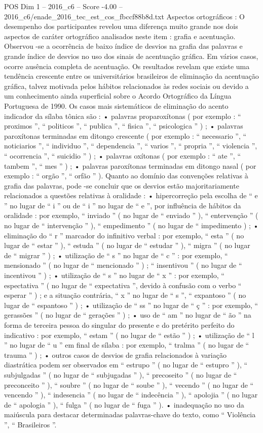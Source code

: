 \begin{textsample}{POS Dim 1 – 2016\_c6 – Score -4.00 – 2016\_c6/enade\_2016\_tec\_est\_cos\_fbccf88b8d.txt}
Aspectos ortográficos : O desempenho dos participantes revelou uma diferença muito grande nos dois aspectos de caráter ortográfico analisados neste item : grafia e acentuação.
Observou -se a ocorrência de baixo índice de desvios na grafia das palavras e grande índice de desvios no uso dos sinais de acentuação gráfica.
Em vários casos, ocorre ausência completa de acentuação.
Os resultados revelam que existe uma tendência crescente entre os universitários brasileiros de eliminação da acentuação gráfica, talvez motivada pelos hábitos relacionados às redes sociais ou devido a um conhecimento ainda superficial sobre o Acordo Ortográfico da Língua Portuguesa de 1990.
Os casos mais sistemáticos de eliminação do acento indicador da sílaba tônica são : • palavras proparoxítonas ( por exemplo : “ proximos ”, “ politicos ”, “ publica ”, “ fisica ”, “ psicologica ” ) ; • palavras paroxítonas terminadas em ditongo crescente ( por exemplo : “ necessario ”, “ noticiarios ”, “ individuo ”, “ dependencia ”, “ varios ”, “ propria ”, “ violencia ”, “ ocorrencia ”, “ suicidio ” ) ; • palavras oxítonas ( por exemplo : “ ate ”, “ tambem ”, “ mes ” ) ; • palavras paroxítonas terminadas em ditongo nasal ( por exemplo : “ orgão ”, “ orfão ” ).
Quanto ao domínio das convenções relativas à grafia das palavras, pode -se concluir que os desvios estão majoritariamente relacionados a questões relativas à oralidade : • hipercorreção pela escolha de “ e ” no lugar de “ i ” ou de “ i ” no lugar de “ e ”, por influência de hábitos da oralidade : por exemplo, “ inviado ” ( no lugar de “ enviado ” ), “ entervenção ” ( no lugar de “ intervenção ” ), “ empedimento ” ( no lugar de “ impedimento ) ; • eliminação do “ r ” marcador do infinitivo verbal : por exemplo, “ esta ” ( no lugar de “ estar ” ), “ estuda ” ( no lugar de “ estudar ” ), “ migra ” ( no lugar de “ migrar ” ) ; • utilização de “ s ” no lugar de “ c ” : por exemplo, “ mensionado ” ( no lugar de “ mencionado ” ) ; “ insentivou ” ( no lugar de “ incentivou ” ) ; • utilização de “ s ” no lugar de “ x ” : por exemplo, “ espectativa ” ( no lugar de “ expectativa ”, devido à confusão com o verbo “ esperar ” ) ; e a situação contrária, “ x ” no lugar de “ s ”, “ expantoso ” ( no lugar de “ espantoso ” ) ; • utilização de “ ss ” no lugar de “ ç ” : por exemplo, “ gerassões ” ( no lugar de “ gerações ” ) ; • uso de “ am ” no lugar de “ ão ” na forma de terceira pessoa do singular do presente e do pretérito perfeito do indicativo : por exemplo, “ estam ” ( no lugar de “ estão ” ) ; • utilização de “ l ” no lugar de “ u ” em final de sílaba : por exemplo, “ tralma ” ( no lugar de “ trauma ” ) ; • outros casos de desvios de grafia relacionados à variação diastrática podem ser observados em “ estrupo ” ( no lugar de “ estupro ” ), “ subjulgadas ” ( no lugar de “ subjugadas ” ), “ precoseito ” ( no lugar de “ preconceito ” ), “ soubre ” ( no lugar de “ soube ” ), “ vecendo ” ( no lugar de “ vencendo ” ), “ indesencia ” ( no lugar de “ indecência ” ), “ apolojia ” ( no lugar de “ apologia ” ), “ fulga ” ( no lugar de “ fuga ” ). • inadequação no uso da maiúscula para destacar determinadas palavras-chave do texto, como “ Violência ”, “ Brasileiros ”.

\end{textsample}
